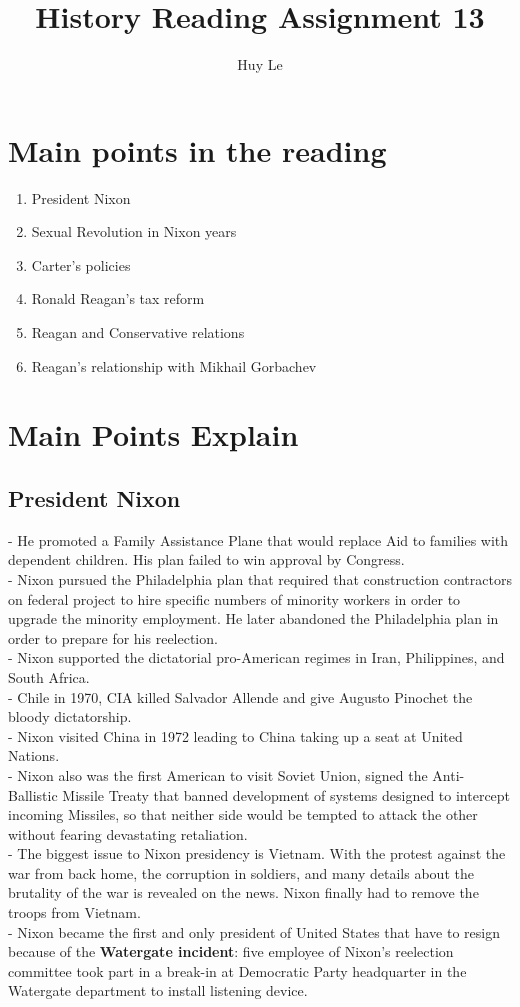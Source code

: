 \documentclass{article}
\begin{document}
\title{History Reading Assignment 13}
\author{Huy Le}
\maketitle
\section{Main points in the reading}
\begin{enumerate}[(1)]
	\item President Nixon
	\item Sexual Revolution in Nixon years
	\item Carter's policies
	\item Ronald Reagan's tax reform
	\item Reagan and Conservative relations
	\item Reagan's relationship with Mikhail Gorbachev
\end{enumerate}

\section{Main Points Explain}

\subsection{President Nixon}
- He promoted a Family Assistance Plane that would replace Aid to families with dependent children. His plan failed to win approval by Congress.\\
- Nixon pursued the Philadelphia plan that required that construction contractors on federal project to hire specific numbers of minority workers in order to upgrade the minority employment. He later abandoned the Philadelphia plan in order to prepare for his reelection.\\
- Nixon supported the dictatorial pro-American regimes in Iran, Philippines, and South Africa. \\
- Chile in 1970, CIA killed Salvador Allende and give Augusto Pinochet the bloody dictatorship.\\
- Nixon visited China in 1972 leading to China taking up a seat at United Nations.\\
- Nixon also was the first American to visit Soviet Union, signed the Anti-Ballistic Missile Treaty that banned development of systems designed to intercept incoming Missiles, so that neither side would  be tempted to attack the other without fearing devastating retaliation.\\
- The biggest issue to Nixon presidency is Vietnam. With the protest against the war from back home, the corruption in soldiers, and many details about the brutality of the war is revealed on the news. Nixon finally had to remove the troops from Vietnam.\\
- Nixon became the first and only president of United States that have to resign because of the \textbf{Watergate incident}: five employee of Nixon's reelection committee took part in a break-in at Democratic Party headquarter in the Watergate department to install listening device.
\end{document}
